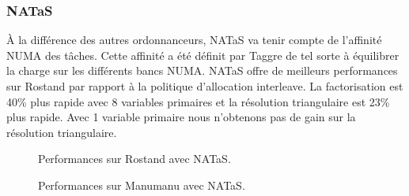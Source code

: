 \subsubsection{NATaS}
\`A la différence des autres ordonnanceurs, NATaS va tenir compte de l'affinité NUMA des tâches.
%
Cette affinité a été définit par Taggre de tel sorte à équilibrer la charge sur les différents bancs NUMA.
%
NATaS offre de meilleurs performances sur Rostand par rapport à la politique d'allocation interleave.
%
La factorisation est 40\% plus rapide avec 8 variables primaires et la résolution triangulaire est 23\% plus rapide.
%
Avec 1 variable primaire nous n'obtenons pas de gain sur la résolution triangulaire.


\begin{figure}[!h]
     \begin{center}
    \end{center}
    \caption{Performances sur Rostand avec NATaS.}
\end{figure}



\begin{figure}[!h]
     \begin{center}
    \end{center}
    \caption{Performances sur Manumanu avec NATaS.}
\end{figure}
